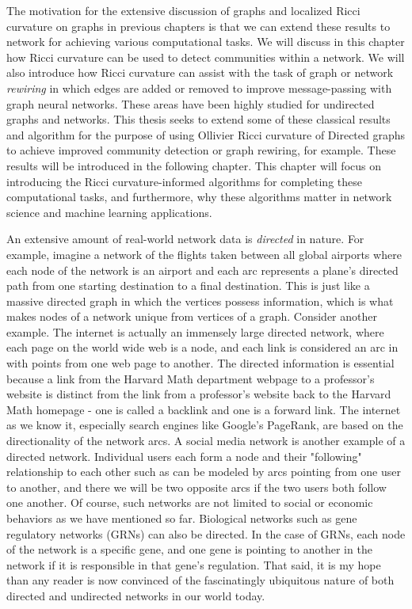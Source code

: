 \documentclass{Dissertate}
\theoremstyle{definition}
\theoremstyle{definition} %
\theoremstyle{definition}
\begin{document}
The motivation for the extensive discussion of graphs and localized Ricci curvature on graphs in previous chapters is that we can extend these results to network for achieving various computational tasks. We will discuss in this chapter how Ricci curvature can be used to detect communities within a network. We will also introduce how Ricci curvature can assist with the task of graph or network \textit{rewiring} in which edges are added or removed to improve message-passing with graph neural networks. These areas have been highly studied for undirected graphs and networks. This thesis seeks to extend some of these classical results and algorithm for the purpose of using Ollivier Ricci curvature of Directed graphs to achieve improved community detection or graph rewiring, for example. These results will be introduced in the following chapter. This chapter will focus on introducing the Ricci curvature-informed algorithms for completing these computational tasks, and furthermore, why these algorithms matter in network science and machine learning applications.

An extensive amount of real-world network data is \textit{directed} in nature. For example, imagine a network of the flights taken between all global airports where each node of the network is an airport and each arc represents a plane's directed path from one starting destination to a final destination. This is just like a massive directed graph in which the vertices possess information, which is what makes nodes of a network unique from vertices of a graph. Consider another example. The internet is actually an immensely large directed network, where each page on the world wide web is a node, and each link is considered an arc in with points from one web page to another. The directed information is essential because a link from the Harvard Math department webpage to a professor's website is distinct from the link from a professor's website back to the Harvard Math homepage - one is called a backlink and one is a forward link. The internet as we know it, especially search engines like Google's PageRank, are based on the directionality of the network arcs. A social media network is another example of a directed network. Individual users each form a node and their "following" relationship to each other such as can be modeled by arcs pointing from one user to another, and there we will be two opposite arcs if the two users both follow one another. Of course, such networks are not limited to social or economic behaviors as we have mentioned so far. Biological networks such as gene regulatory networks (GRNs) can also be directed. In the case of GRNs, each node of the network is a specific gene, and one gene is pointing to another in the network if it is responsible in that gene's regulation. That said, it is my hope than any reader is now convinced of the fascinatingly ubiquitous nature of both directed and undirected networks in our world today.
\end{document}

